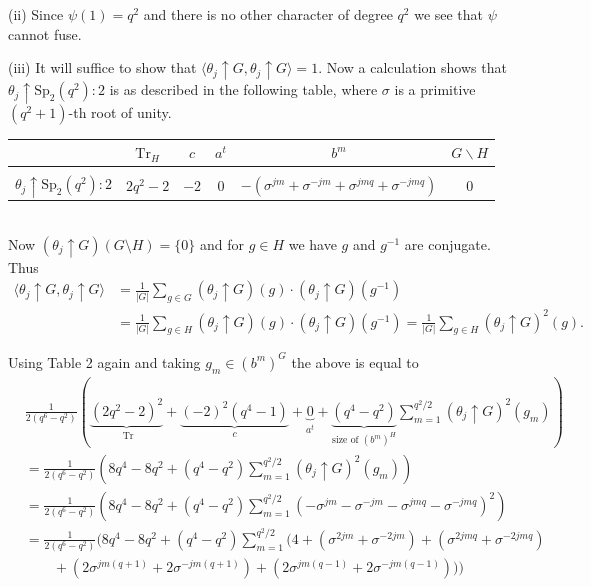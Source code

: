 \documentclass{amsart}
\begin{document}
\noindent (ii) Since $\psi(1)=q^2$ and there is no other character of degree $q^2$ we see that $\psi$ cannot fuse.

\noindent (iii)  It will suffice to show that $\langle \theta_j \uparrow G,\theta_j \uparrow G\rangle=1$. 
Now a calculation shows that $\theta_j \uparrow \mathrm{Sp}_2(q^2)\colon 2$ 
is as  described in the following  table, where $\sigma$ is a primitive $(q^2+1)$-th root of unity. 
\\[5mm]
\begin{tabular}{c|ccccc}
 & $\text{Tr}_H$ & $c$ & $a^t$ & $b^m$ & $G \smallsetminus H$\\
\hline\\
$\theta_j \uparrow \mathrm{Sp}_2(q^2)\colon 2$ & $2q^2-2$ & $-2$ & $0$ & $-(\sigma^{jm} + \sigma^{-jm}+\sigma^{jmq} + \sigma^{-jmq})$ & $0$
\end{tabular}
\\[5mm]
Now 
$(\theta_j\uparrow G)(G \setminus H)=\{0\}$ and 
for $g \in H$ we have $g$ and $g^{-1}$ are conjugate. Thus 
\begin{align*}
\langle \theta_j\uparrow G, \theta_j\uparrow G\rangle &= \frac{1}{|G|} \sum_{g\in G}(\theta_j\uparrow G)(g)\cdot (\theta_j\uparrow G)\left(g^{-1}\right)\\&=
\frac{1}{|G|} \sum_{g\in H}(\theta_j\uparrow G)(g)\cdot (\theta_j\uparrow G)(g^{-1})
=\frac{1}{|G|} \sum_{g\in H}(\theta_j\uparrow G)^2(g).
\end{align*}

Using Table 2 again and taking $g_m \in (b^m)^G$  the above is equal to
\begin{align*}&
\frac{1}{2(q^6-q^2)}\left(\underbrace{(2q^2-2)^2}_{\text{ Tr}} + \underbrace{(-2)^2(q^4-1)}_{c} + \underbrace{0}_{\text{$a^t$}}+\underbrace{(q^4-q^2)}_{\text{size of $(b^m)^H$}} {\sum_{m=1}^{q^2/2}}\left(\theta_j\uparrow G\right)^2(g_m)\right)
\\&=
\frac{1}{2(q^6-q^2)}\left({8q^4-8q^2} + {(q^4-q^2)} {\sum_{m=1}^{q^2/2}}  {\left(\theta_j\uparrow G\right)^2(g_m)}\right)
\\&=
\frac{1}{2(q^6-q^2)}\left(8q^4-8q^2+(q^4-q^2)\sum_{m=1}^{q^2/2}\left(-\sigma^{jm}-\sigma^{-jm}-\sigma^{jmq}-\sigma^{-jmq}\right)^2\right)
\\&=
\frac{1}{2(q^6-q^2)}
\bigg (
8q^4-8q^2+(q^4-q^2)\sum_{m=1}^{q^2/2}
\big (
4 +  {(\sigma^{2jm}+\sigma^{-2jm})}+ (\sigma^{2jmq} +\sigma^{-2jmq})\\&\qquad  + (2\sigma^{jm(q+1)} + 2\sigma^{-jm(q+1)}) + (2\sigma^{jm(q-1)} + 2\sigma^{-jm(q-1)})
\big )
\bigg )
\end{align*}
 
\end{document}
